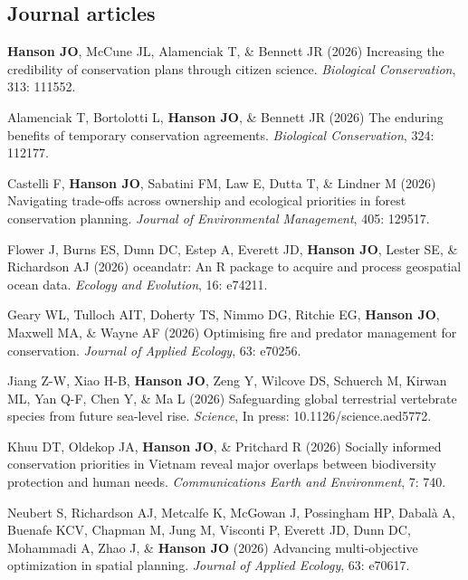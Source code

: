 \documentclass[12pt,a4paper]{article}
\begin{document}
\subsection*{Journal articles}
\begin{description}

\item[2026] \textbf{Hanson JO}, McCune JL, Alamenciak T, \& Bennett JR (2026) Increasing the credibility of conservation plans through citizen science. \textit{Biological Conservation}, 313: 111552.

\item Alamenciak T, Bortolotti L, \textbf{Hanson JO}, \& Bennett JR (2026) The enduring benefits of temporary conservation agreements. \textit{Biological Conservation}, 324: 112177.

\item[] Castelli F, \textbf{Hanson JO}, Sabatini FM, Law E, Dutta T, \& Lindner M (2026) Navigating trade-offs across ownership and ecological priorities in forest conservation planning. \textit{Journal of Environmental Management}, 405: 129517.

\item[] Flower J, Burns ES, Dunn DC, Estep A, Everett JD, \textbf{Hanson JO}, Lester SE, \& Richardson AJ (2026) oceandatr: An R package to acquire and process geospatial ocean data. \textit{Ecology and Evolution}, 16: e74211.

\item[] Geary WL, Tulloch AIT, Doherty TS, Nimmo DG, Ritchie EG, \textbf{Hanson JO}, Maxwell MA, \& Wayne AF (2026) Optimising fire and predator management for conservation. \textit{Journal of Applied Ecology}, 63: e70256.

\item[] Jiang Z-W, Xiao H-B, \textbf{Hanson JO}, Zeng Y, Wilcove DS, Schuerch M, Kirwan ML, Yan Q-F, Chen Y, \& Ma L (2026) Safeguarding global terrestrial vertebrate species from future sea-level rise. \textit{Science}, In press: 10.1126/science.aed5772.

\item[] Khuu DT, Oldekop JA, \textbf{Hanson JO}, \& Pritchard R (2026) Socially informed conservation priorities in Vietnam reveal major overlaps between biodiversity protection and human needs. \textit{Communications Earth and Environment}, 7: 740.

\item[] Neubert S, Richardson AJ, Metcalfe K, McGowan J, Possingham HP, Dabalà A, Buenafe KCV, Chapman M, Jung M, Visconti P, Everett JD, Dunn DC, Mohammadi A, Zhao J, \& \textbf{Hanson JO} (2026) Advancing multi‐objective optimization in spatial planning. \textit{Journal of Applied Ecology}, 63: e70617.


\end{description}
\end{document}
